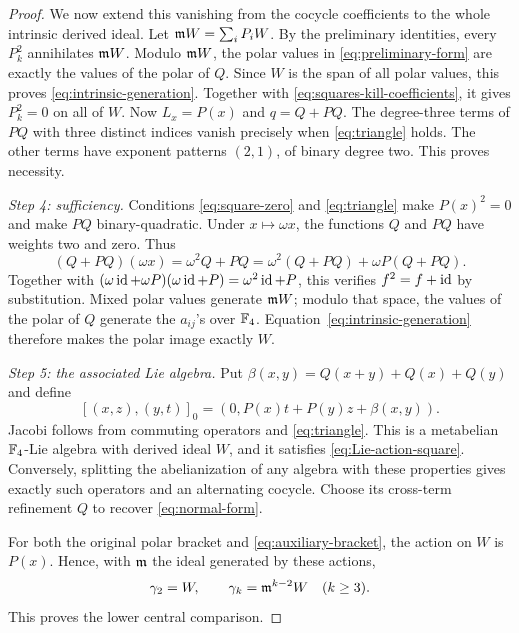\begin{proof}
We now extend this vanishing from the cocycle coefficients to the whole
intrinsic derived ideal. Let \(\mathfrak m W=\sum_iP_iW\). By the preliminary identities,
every \(P_k^2\) annihilates \(\mathfrak m W\).
Modulo \(\mathfrak m W\), the polar values in
\eqref{eq:preliminary-form} are exactly the values of the polar of \(Q\).
Since \(W\) is the span of all polar values, this proves
\eqref{eq:intrinsic-generation}.
Together with \eqref{eq:squares-kill-coefficients}, it gives \(P_k^2=0\)
on all of \(W\). Now \(L_x=P(x)\) and \(q=Q+PQ\).
The degree-three terms of \(PQ\) with three distinct indices vanish
precisely when \eqref{eq:triangle} holds. The other terms have exponent
patterns \((2,1)\), of binary degree two. This proves necessity.

\emph{Step 4: sufficiency.}
Conditions \eqref{eq:square-zero} and \eqref{eq:triangle} make
\(P(x)^2=0\) and make \(PQ\) binary-quadratic.
Under \(x\mapsto\omega x\), the functions \(Q\) and \(PQ\) have weights
two and zero. Thus
\[
 (Q+PQ)(\omega x)=\omega^2Q+PQ
   =\omega^2(Q+PQ)+\omega P(Q+PQ).
\]
Together with
\((\omega\operatorname{id}+\omega P)(\omega\operatorname{id}+P)=\omega^2\operatorname{id}+P\),
this verifies \(f^2=f+\operatorname{id}\) by substitution.
Mixed polar values generate \(\mathfrak m W\); modulo that space, the values
of the polar of \(Q\) generate the \(a_{ij}\)'s over \(\mathbb F_4\).
Equation~\eqref{eq:intrinsic-generation} therefore makes the polar
image exactly \(W\).

\emph{Step 5: the associated Lie algebra.}
Put \(\beta(x,y)=Q(x+y)+Q(x)+Q(y)\) and define
\begin{equation}\label{eq:auxiliary-bracket}
 [(x,z),(y,t)]_0=(0,P(x)t+P(y)z+\beta(x,y)).
\end{equation}
Jacobi follows from commuting operators and \eqref{eq:triangle}.
This is a metabelian \(\mathbb F_4\)-Lie algebra with derived ideal \(W\),
and it satisfies \eqref{eq:Lie-action-square}.
Conversely, splitting the abelianization of any algebra with these
properties gives exactly such operators and an alternating cocycle.
Choose its cross-term refinement \(Q\) to recover
\eqref{eq:normal-form}.

For both the original polar bracket and \eqref{eq:auxiliary-bracket},
the action on \(W\) is \(P(x)\). Hence, with \(\mathfrak m\) the ideal generated
by these actions,
\begin{equation}\label{eq:lower-central-module}
 \gamma_2=W,\qquad\gamma_k=\mathfrak m^{k-2}W\quad(k\ge3).
\end{equation}
This proves the lower central comparison.


\end{proof}
